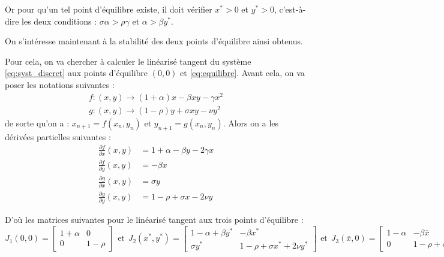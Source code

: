 Or pour qu'un tel point d'équilibre existe, il doit vérifier $x^* > 0$ et $y^* > 0$, c'est-à-dire les deux conditions : $\sigma \alpha > \rho \gamma$ et $\alpha > \beta y^*$.
\vspace{5pt}

On s'intéresse maintenant à la stabilité des deux points d'équilibre ainsi obtenus.

Pour cela, on va chercher à calculer le linéarisé tangent du système \ref{eq:syst_discret} aux points d'équilibre $(0, 0)$ et \ref{eq:equilibre}.
Avant cela, on va poser les notations suivantes :
\begin{align}
    f : (x, y) \rightarrow (1 + \alpha) x - \beta x y - \gamma x^2 \\
    g : (x, y) \rightarrow (1 - \rho) y + \sigma x y - \nu y^2
\end{align}
de sorte qu'on a : $x_{n+1} = f(x_n, y_n)$ et $y_{n+1} = g(x_n, y_n)$.
\newline
Alors on a les dérivées partielles suivantes :
\begin{align}
    \frac{\partial f}{\partial x}(x,y) &= 1 + \alpha - \beta y - 2 \gamma x \\
    \frac{\partial f}{\partial y}(x,y) &= - \beta x \\
    \frac{\partial g}{\partial x}(x,y) &= \sigma y \\
    \frac{\partial g}{\partial y}(x,y) &= 1 - \rho + \sigma x - 2 \nu y 
\end{align}

D'où les matrices suivantes pour le linéarisé tangent aux trois points d'équilibre :
\begin{equation}
    J_{1}(0,0) = 
  \begin{bmatrix}
    1 + \alpha & 0 \\
    0 & 1 - \rho
  \end{bmatrix}
  \hspace{5pt}
  \text{et}
  \hspace{5pt}
  J_{2}(x^*, y^*) = 
  \begin{bmatrix}
    1 - \alpha + \beta y^* & - \beta x^* \\
    \sigma y^* & 1 - \rho + \sigma x^* + 2 \nu y^*
  \end{bmatrix}
  \hspace{5pt}
  \text{et}
  \hspace{5pt}
  J_{3}(\bar{x}, 0) = 
  \begin{bmatrix}
    1 - \alpha & - \beta \bar{x} \\
    0 & 1 - \rho + \sigma \bar{x}
  \end{bmatrix}
\end{equation}

